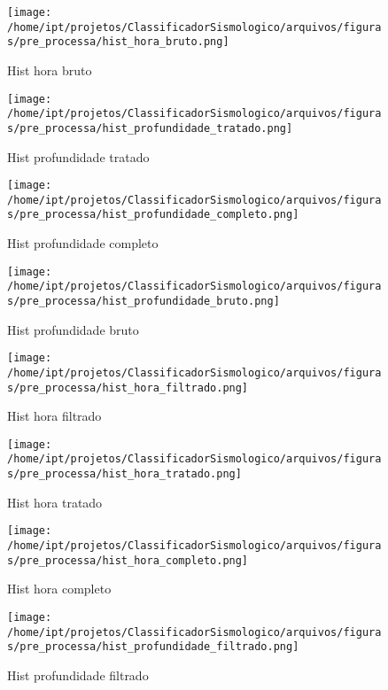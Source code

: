 
    \begin{figure}[H]
        \centering
        \texttt{[image: /home/ipt/projetos/ClassificadorSismologico/arquivos/figuras/pre\_processa/hist\_hora\_bruto.png]}
        \caption{Hist hora bruto}
        \label{fig:hist_hora_bruto}
    \end{figure}
                

    \begin{figure}[H]
        \centering
        \texttt{[image: /home/ipt/projetos/ClassificadorSismologico/arquivos/figuras/pre\_processa/hist\_profundidade\_tratado.png]}
        \caption{Hist profundidade tratado}
        \label{fig:hist_profundidade_tratado}
    \end{figure}
                

    \begin{figure}[H]
        \centering
        \texttt{[image: /home/ipt/projetos/ClassificadorSismologico/arquivos/figuras/pre\_processa/hist\_profundidade\_completo.png]}
        \caption{Hist profundidade completo}
        \label{fig:hist_profundidade_completo}
    \end{figure}
                

    \begin{figure}[H]
        \centering
        \texttt{[image: /home/ipt/projetos/ClassificadorSismologico/arquivos/figuras/pre\_processa/hist\_profundidade\_bruto.png]}
        \caption{Hist profundidade bruto}
        \label{fig:hist_profundidade_bruto}
    \end{figure}
                

    \begin{figure}[H]
        \centering
        \texttt{[image: /home/ipt/projetos/ClassificadorSismologico/arquivos/figuras/pre\_processa/hist\_hora\_filtrado.png]}
        \caption{Hist hora filtrado}
        \label{fig:hist_hora_filtrado}
    \end{figure}
                

    \begin{figure}[H]
        \centering
        \texttt{[image: /home/ipt/projetos/ClassificadorSismologico/arquivos/figuras/pre\_processa/hist\_hora\_tratado.png]}
        \caption{Hist hora tratado}
        \label{fig:hist_hora_tratado}
    \end{figure}
                

    \begin{figure}[H]
        \centering
        \texttt{[image: /home/ipt/projetos/ClassificadorSismologico/arquivos/figuras/pre\_processa/hist\_hora\_completo.png]}
        \caption{Hist hora completo}
        \label{fig:hist_hora_completo}
    \end{figure}
                

    \begin{figure}[H]
        \centering
        \texttt{[image: /home/ipt/projetos/ClassificadorSismologico/arquivos/figuras/pre\_processa/hist\_profundidade\_filtrado.png]}
        \caption{Hist profundidade filtrado}
        \label{fig:hist_profundidade_filtrado}
    \end{figure}
                